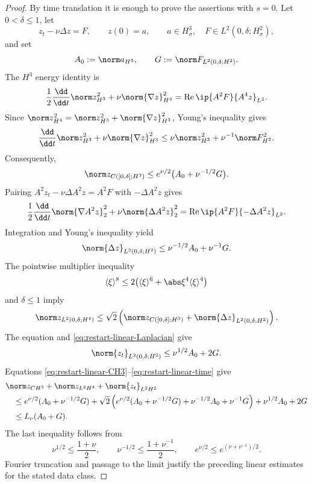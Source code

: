 \begin{proof}
By time translation it is enough to prove the assertions with \(s=0\).
Let \(0<\delta\le1\), let
\[
 z_t-\nu\Delta z=F,
 \qquad z(0)=a,
 \qquad
 a\in H^3_\sigma,\quad
 F\in L^2(0,\delta;H^2_\sigma),
\]
and set
\[
 A_0:=\norm a_{H^3},
 \qquad
 G:=\norm F_{L^2(0,\delta;H^2)}.
\]
The \(H^3\) energy identity is
\[
 \frac12\frac{\dd}{\dd t}\norm z_{H^3}^2
 +\nu\norm{\nabla z}_{H^3}^2
 =\operatorname{Re}\ip{A^2F}{A^4z}_{L^2}.
\]
Since
\(\norm z_{H^4}^2=\norm z_{H^3}^2+\norm{\nabla z}_{H^3}^2\),
Young's inequality gives
\[
 \frac{\dd}{\dd t}\norm z_{H^3}^2
 +\nu\norm{\nabla z}_{H^3}^2
 \le \nu\norm z_{H^3}^2+\nu^{-1}\norm F_{H^2}^2.
\]
Consequently,
\begin{equation}
 \norm z_{C([0,\delta];H^3)}
 \le e^{\nu/2}\bigl(A_0+\nu^{-1/2}G\bigr).
 \label{eq:restart-linear-CH3}
\end{equation}
Pairing \(A^2z_t-\nu\Delta A^2z=A^2F\) with
\(-\Delta A^2z\) gives
\[
 \frac12\frac{\dd}{\dd t}\norm{\nabla A^2z}_2^2
 +\nu\norm{\Delta A^2z}_2^2
 =\operatorname{Re}\ip{A^2F}{-\Delta A^2z}_{L^2}.
\]
Integration and Young's inequality yield
\begin{equation}
 \norm{\Delta z}_{L^2(0,\delta;H^2)}
 \le \nu^{-1/2}A_0+\nu^{-1}G.
 \label{eq:restart-linear-Laplacian}
\end{equation}
The pointwise multiplier inequality
\[
 \langle\xi\rangle^8
 \le2\bigl(\langle\xi\rangle^6
       +\abs\xi^4\langle\xi\rangle^4\bigr)
\]
and \(\delta\le1\) imply
\begin{equation}
 \norm z_{L^2(0,\delta;H^4)}
 \le\sqrt2\left(
 \norm z_{C([0,\delta];H^3)}
 +\norm{\Delta z}_{L^2(0,\delta;H^2)}
 \right).
 \label{eq:restart-linear-H4}
\end{equation}
The equation and \eqref{eq:restart-linear-Laplacian} give
\begin{equation}
 \norm{z_t}_{L^2(0,\delta;H^2)}
 \le\nu^{1/2}A_0+2G.
 \label{eq:restart-linear-time}
\end{equation}
Equations \eqref{eq:restart-linear-CH3}--\eqref{eq:restart-linear-time}
give
\begin{align*}
 &\norm z_{C H^3}+\norm z_{L^2H^4}+\norm{z_t}_{L^2H^2}\\
 &\quad\le
 e^{\nu/2}(A_0+\nu^{-1/2}G)
 +\sqrt2\left(
 e^{\nu/2}(A_0+\nu^{-1/2}G)
 +\nu^{-1/2}A_0+\nu^{-1}G\right)
 +\nu^{1/2}A_0+2G\\
 &\quad\le L_\nu(A_0+G).
\end{align*}
The last inequality follows from
\[
 \nu^{1/2}\le\frac{1+\nu}{2},
 \qquad
 \nu^{-1/2}\le\frac{1+\nu^{-1}}2,
 \qquad
 e^{\nu/2}\le e^{(\nu+\nu^{-1})/2}.
\]
Fourier truncation and passage to the limit justify the preceding linear
estimates for the stated data class.


\end{proof}

